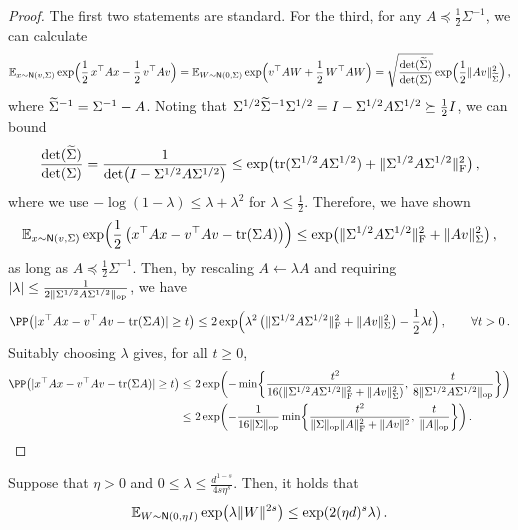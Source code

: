 \begin{proof}
    \newcommand{\tSigma}{\wt{\Sigma}}
The first two statements are standard. For the third, for any $A\preceq \frac12\Sigma^{-1}$, we can calculate
\begin{align*}
    \En_{x\sim \normal{v,\Sigma}}\exp\prn[\Big]{\frac12\,x\tp Ax-\frac12\,v\tp A v}
    =\En_{W\sim \normal{0,\Sigma}} \exp\prn[\Big]{ v\tp A W+\frac12\, W\tp A W }
    =\sqrt{\frac{\det(\tSigma)}{\det(\Sigma)}}\exp\prn[\Big]{ \frac12\nrm{Av}_{\tSigma}^2 }\,,
\end{align*}
where $\tSigma^{-1}=\Sigma^{-1}-A$. Noting that $\Sigma^{1/2}\tSigma^{-1}\Sigma^{1/2}=\Id-\Sigma^{1/2}A\Sigma^{1/2}\succeq \frac12\Id$, we can bound
\begin{align*}
    \frac{\det(\tSigma)}{\det(\Sigma)}=\frac{1}{\det\prn*{\Id-\Sigma^{1/2}A\Sigma^{1/2}}}\leq \exp\prn[\big]{\tr(\Sigma^{1/2}A\Sigma^{1/2})+\nrmF{\Sigma^{1/2}A\Sigma^{1/2}}^2}\,,
\end{align*}
where we use $-\log(1-\lambda)\leq \lambda+\lambda^2$ for $\lambda\leq \frac12$. Therefore, we have shown
\begin{align*}
    \En_{x\sim \normal{v,\Sigma}}\exp\prn[\Big]{\frac12\,\prn*{x\tp Ax-v\tp A v-\tr(\Sigma A)}}
    \leq\exp\prn[\big]{\nrmF{\Sigma^{1/2}A\Sigma^{1/2}}^2+\nrm{Av}_{\Sigma}^2}\,, 
\end{align*}
as long as $A\preceq \frac12\Sigma^{-1}$. Then, by rescaling $A\leftarrow \lambda A$ and requiring $\lvert\lambda\rvert\leq \frac{1}{2\lVert\Sigma^{1/2}A\Sigma^{1/2}\|_{\mathrm{op}}}$, we have
\begin{align*}
    \PP\prn*{\abs{x\tp Ax-v\tp A v-\tr(\Sigma A)}\geq t}\leq 2\exp\prn[\Big]{ \lambda^2\,\prn[\big]{\nrmF{\Sigma^{1/2}A\Sigma^{1/2}}^2+\nrm{Av}_{\Sigma}^2}-\frac12\lambda t }\,, \qquad \forall t>0\,.
\end{align*}
Suitably choosing $\lambda$ gives, for all $t\ge 0$,
\begin{align*}
    \PP\prn*{\abs{x\tp Ax-v\tp A v-\tr(\Sigma A)}\geq t}\leq&~ 2\exp\prn*{ -\min\crl*{\frac{t^2}{16(\nrmF{\Sigma^{1/2}A\Sigma^{1/2}}^2+\nrm{Av}_{\Sigma}^2)},\, \frac{t}{8\nrmop{\Sigma^{1/2}A\Sigma^{1/2}}} }} \\
    \leq&~ 2\exp\prn*{ -\frac{1}{16\nrmop{\Sigma}}\min\crl*{\frac{t^2}{\nrmop{\Sigma}\nrmF{A}^2+\nrm{Av}^2},\, \frac{t}{\nrmop{A}} }}\,.
\end{align*}
\end{proof}


\begin{lemma}\label{lem:Gaussian-s}
Suppose that $\eta>0$ and $0\leq \lambda\leq \frac{d^{1-s}}{4s\eta^s}$. Then, it holds that
\begin{align*}
    \En_{W\sim \normal{0,\eta\Id}} \exp\prn*{\lambda\nrm{W}^{2s}}\leq \exp\prn*{2(\eta d)^s \lambda}\,.
\end{align*}
\end{lemma}

